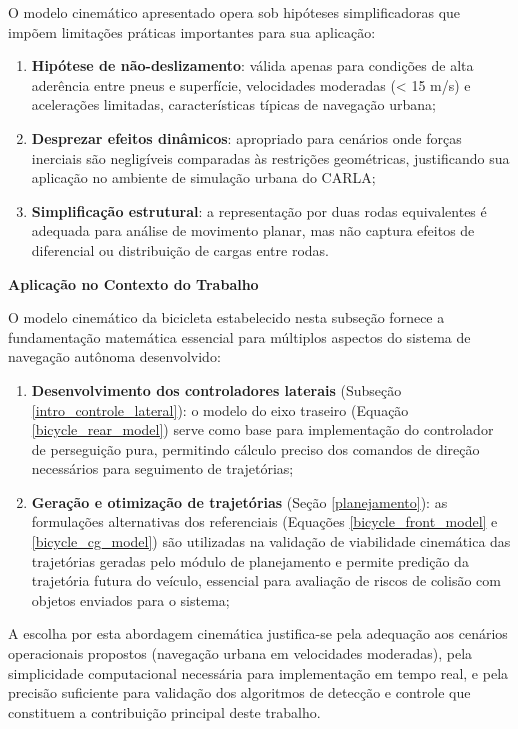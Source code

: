 O modelo cinemático apresentado opera sob hipóteses simplificadoras que impõem limitações práticas importantes para sua aplicação:

\begin{enumerate}
\item \textbf{Hipótese de não-deslizamento}: válida apenas para condições de alta aderência entre pneus e superfície, velocidades moderadas (< 15 m/s) e acelerações limitadas, características típicas de navegação urbana;
\item \textbf{Desprezar efeitos dinâmicos}: apropriado para cenários onde forças inerciais são negligíveis comparadas às restrições geométricas, justificando sua aplicação no ambiente de simulação urbana do CARLA;
\item \textbf{Simplificação estrutural}: a representação por duas rodas equivalentes é adequada para análise de movimento planar, mas não captura efeitos de diferencial ou distribuição de cargas entre rodas.
\end{enumerate}

\textbf{Aplicação no Contexto do Trabalho}

O modelo cinemático da bicicleta estabelecido nesta subseção fornece a fundamentação matemática essencial para múltiplos aspectos do sistema de navegação autônoma desenvolvido:

\begin{enumerate}
\item \textbf{Desenvolvimento dos controladores laterais} (Subseção \ref{intro_controle_lateral}): o modelo do eixo traseiro (Equação \ref{bicycle_rear_model}) serve como base para implementação do controlador de perseguição pura, permitindo cálculo preciso dos comandos de direção necessários para seguimento de trajetórias;

\item \textbf{Geração e otimização de trajetórias} (Seção \ref{planejamento}): as formulações alternativas dos referenciais (Equações \ref{bicycle_front_model} e \ref{bicycle_cg_model}) são utilizadas na validação de viabilidade cinemática das trajetórias geradas pelo módulo de planejamento e permite predição da trajetória futura do veículo, essencial para avaliação de riscos de colisão com objetos enviados para o sistema;

\end{enumerate}

A escolha por esta abordagem cinemática justifica-se pela adequação aos cenários operacionais propostos (navegação urbana em velocidades moderadas), pela simplicidade computacional necessária para implementação em tempo real, e pela precisão suficiente para validação dos algoritmos de detecção e controle que constituem a contribuição principal deste trabalho.

